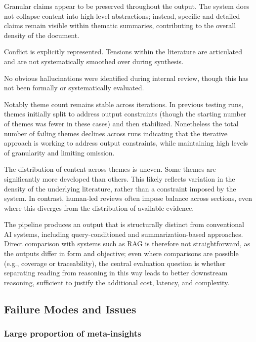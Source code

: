 \documentclass[
  11pt,
]{article}
\begin{document}
Granular claims appear to be preserved throughout the output. The system does not
collapse content into high-level abstractions; instead, specific and
detailed claims remain visible within thematic summaries, contributing
to the overall density of the document.

Conflict is explicitly represented. Tensions within the literature are
articulated and are not systematically smoothed over during synthesis.

No obvious hallucinations were identified during internal review, though
this has not been formally or systematically evaluated.

Notably theme count remains stable across iterations. In previous 
testing runs, themes initially split to address output constraints 
(though the starting number of themes was fewer in these cases) and 
then stabilized. Nonetheless the total number of failing themes declines 
across runs indicating that the iterative approach is working to address 
output constraints, while maintaining high levels of granularity and 
limiting omission.

The distribution of content across themes is uneven. Some themes are
significantly more developed than others. This likely reflects variation
in the density of the underlying literature, rather than a constraint
imposed by the system. In contrast, human-led reviews often impose
balance across sections, even where this diverges from the distribution
of available evidence.

The pipeline produces an output that is structurally distinct from conventional 
AI systems, including query-conditioned and summarization-based approaches. 
Direct comparison with systems such as RAG is therefore not straightforward, 
as the outputs differ in form and objective; even where comparisons are possible 
(e.g., coverage or traceability), the central evaluation question is whether 
separating reading from reasoning in this way leads to better downstream reasoning, 
sufficient to justify the additional cost, latency, and complexity.

\subsection{Failure Modes and
Issues}\label{failure-modes-and-issues}

\subsubsection{Large proportion of
meta-insights}\label{large-proportion-of-meta-insights}
\end{document}
